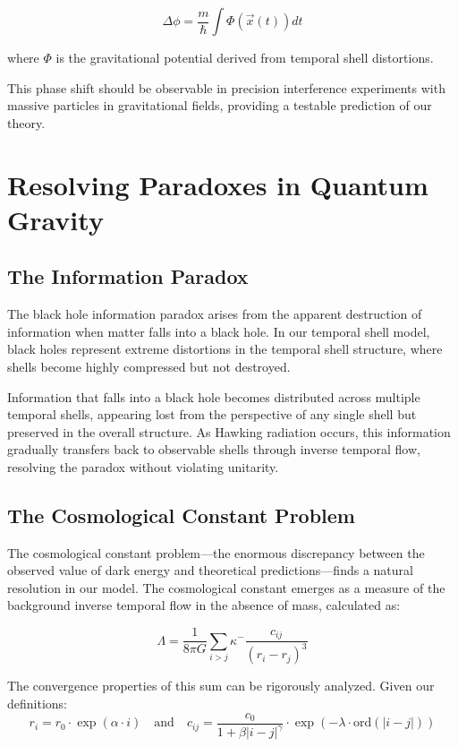 \documentclass[12pt,a4paper]{article}
\begin{document}
\begin{equation}
\Delta \phi = \frac{m}{\hbar} \int \Phi(\vec{x}(t)) dt
\end{equation}

where $\Phi$ is the gravitational potential derived from temporal shell distortions.

This phase shift should be observable in precision interference experiments with massive particles in gravitational fields, providing a testable prediction of our theory.

\section{Resolving Paradoxes in Quantum Gravity}

\subsection{The Information Paradox}

The black hole information paradox arises from the apparent destruction of information when matter falls into a black hole. In our temporal shell model, black holes represent extreme distortions in the temporal shell structure, where shells become highly compressed but not destroyed.

Information that falls into a black hole becomes distributed across multiple temporal shells, appearing lost from the perspective of any single shell but preserved in the overall structure. As Hawking radiation occurs, this information gradually transfers back to observable shells through inverse temporal flow, resolving the paradox without violating unitarity.

\subsection{The Cosmological Constant Problem}

The cosmological constant problem—the enormous discrepancy between the observed value of dark energy and theoretical predictions—finds a natural resolution in our model. The cosmological constant emerges as a measure of the background inverse temporal flow in the absence of mass, calculated as:

\begin{equation}
\Lambda = \frac{1}{8\pi G} \sum_{i>j} \kappa^- \frac{c_{ij}}{(r_i - r_j)^3}
\end{equation}

The convergence properties of this sum can be rigorously analyzed. Given our definitions:
\begin{equation}
r_i = r_0 \cdot \exp(\alpha \cdot i) \quad \text{and} \quad c_{ij} = \frac{c_0}{1 + \beta |i-j|^\gamma} \cdot \exp(-\lambda \cdot \text{ord}(|i-j|))
\end{equation}
\end{document}
